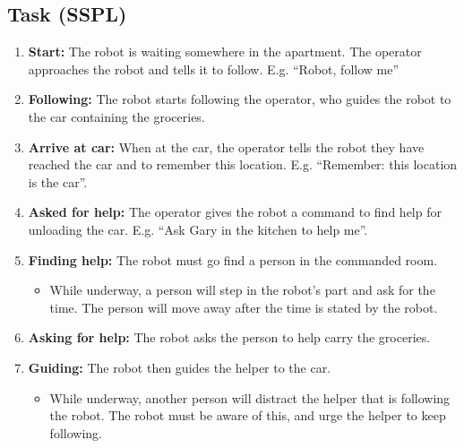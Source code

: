 \subsection{Task (SSPL)}
\begin{enumerate}
	\item \textbf{Start:} The robot is waiting somewhere in the apartment. The operator approaches the robot and tells it to follow. E.g. ``Robot, follow me''
	\item \textbf{Following:} The robot starts following the operator, who guides the robot to the car containing the groceries. 
	\item \textbf{Arrive at car:} When at the car, the operator tells the robot they have reached the car and to remember this location. E.g. ``Remember: this location is the car''. 
	\item \textbf{Asked for help:} The operator gives the robot a command to find help for unloading the car.  E.g. ``Ask Gary in the kitchen to help me''.
	\item \textbf{Finding help:} The robot must go find a person in the commanded room.
		\begin{itemize}
			\item While underway, a person will step in the robot's part and ask for the time. The person will move away after the time is stated by the robot. 
		\end{itemize}
	\item \textbf{Asking for help:} The robot asks the person to help carry the groceries.
	\item \textbf{Guiding:} The robot then guides the helper to the car.
		\begin{itemize}
			\item While underway, another person will distract the helper that is following the robot. The robot must be aware of this, and urge the helper to keep following. 
		\end{itemize}
\end{enumerate}

